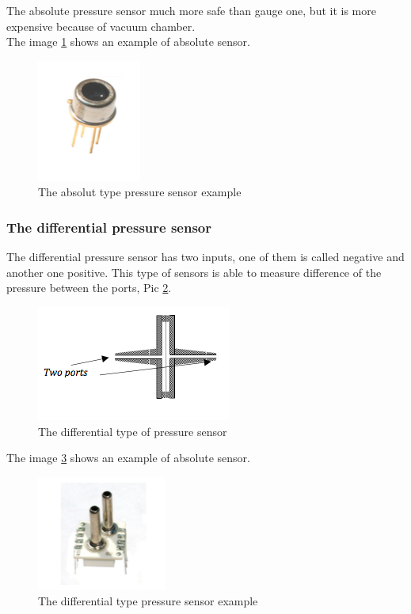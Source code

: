 \documentclass[english]{article}
\begin{document}
The absolute pressure sensor much more safe than gauge one, but it is more expensive because of vacuum chamber.\cite{spd}\\

The image \ref{fig:absPhoto} shows an example of absolute sensor.

\begin{figure}[H]
\centerline{\includegraphics[scale=0.7]{PressureSensors/absPhoto}}
\caption{The absolut type pressure sensor example \label{fig:absPhoto}}
\end{figure}

\subsubsection{The differential pressure sensor}
The differential pressure sensor has two inputs, one of them is called negative and another one positive. This type of sensors is able to measure difference of the pressure between the ports, Pic \ref{fig:diff}.\cite{spd}

\begin{figure}[H]
\centerline{\includegraphics[scale=1]{PressureSensors/diff}}
\caption{The differential type of pressure sensor \label{fig:diff}}
\end{figure}

The image \ref{fig:diffPhoto} shows an example of absolute sensor.

\begin{figure}[H]
\centerline{\includegraphics[scale=0.7]{PressureSensors/diffPhoto}}
\caption{The differential type pressure sensor example \label{fig:diffPhoto}}
\end{figure}
\end{document}
